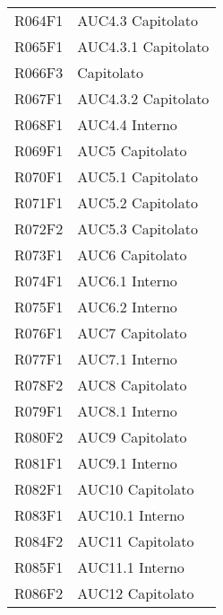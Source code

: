 \documentclass[../analisi-dei-requisiti.tex]{subfiles}
\begin{document}
\begin{longtable}[H]{>{\centering}m{5cm} >{\centering}m{5cm}}
  R064F1                               & AUC4.3 Capitolato             \\
  R065F1                               & AUC4.3.1 Capitolato           \\
  R066F3                               & Capitolato                    \\
  R067F1                               & AUC4.3.2 Capitolato           \\
  R068F1                               & AUC4.4 Interno                \\
  R069F1                               & AUC5 Capitolato               \\
  R070F1                               & AUC5.1 Capitolato             \\
  R071F1                               & AUC5.2 Capitolato             \\
  R072F2                               & AUC5.3 Capitolato             \\
  R073F1                               & AUC6 Capitolato               \\
  R074F1                               & AUC6.1 Interno                \\
  R075F1                               & AUC6.2 Interno                \\
  R076F1                               & AUC7 Capitolato               \\
  R077F1                               & AUC7.1 Interno                \\
  R078F2                               & AUC8 Capitolato               \\
  R079F1                               & AUC8.1 Interno                \\
  R080F2                               & AUC9 Capitolato               \\
  R081F1                               & AUC9.1 Interno                \\
  R082F1                               & AUC10 Capitolato              \\
  R083F1                               & AUC10.1 Interno               \\
  R084F2                               & AUC11 Capitolato              \\
  R085F1                               & AUC11.1 Interno               \\
  R086F2                               & AUC12 Capitolato              \\

\end{longtable}
\end{document}
